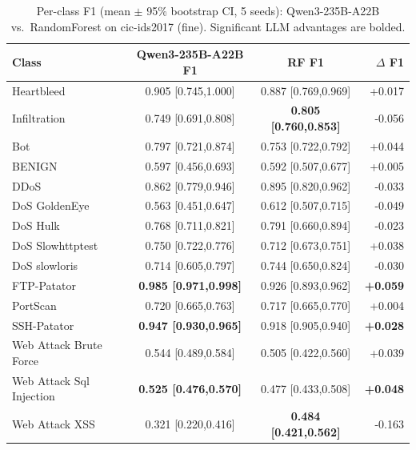 \begin{table}[t]
\caption{Per-class F1 (mean $\pm$ 95\% bootstrap CI, 5 seeds): Qwen3-235B-A22B vs.\ RandomForest on cic-ids2017 (fine). Significant LLM advantages are bolded.}
\label{t:r2_perclass}
\begin{tabular}{lccr}
\hline
Class & Qwen3-235B-A22B F1 & RF F1 & $\Delta$ F1 \\
\hline
Heartbleed & 0.905 [0.745,1.000] & 0.887 [0.769,0.969] & +0.017 \\
Infiltration & 0.749 [0.691,0.808] & \textbf{0.805 [0.760,0.853]} & -0.056 \\
Bot & 0.797 [0.721,0.874] & 0.753 [0.722,0.792] & +0.044 \\
BENIGN & 0.597 [0.456,0.693] & 0.592 [0.507,0.677] & +0.005 \\
DDoS & 0.862 [0.779,0.946] & 0.895 [0.820,0.962] & -0.033 \\
DoS GoldenEye & 0.563 [0.451,0.647] & 0.612 [0.507,0.715] & -0.049 \\
DoS Hulk & 0.768 [0.711,0.821] & 0.791 [0.660,0.894] & -0.023 \\
DoS Slowhttptest & 0.750 [0.722,0.776] & 0.712 [0.673,0.751] & +0.038 \\
DoS slowloris & 0.714 [0.605,0.797] & 0.744 [0.650,0.824] & -0.030 \\
FTP-Patator & \textbf{0.985 [0.971,0.998]} & 0.926 [0.893,0.962] & \textbf{+0.059} \\
PortScan & 0.720 [0.665,0.763] & 0.717 [0.665,0.770] & +0.004 \\
SSH-Patator & \textbf{0.947 [0.930,0.965]} & 0.918 [0.905,0.940] & \textbf{+0.028} \\
Web Attack  Brute Force & 0.544 [0.489,0.584] & 0.505 [0.422,0.560] & +0.039 \\
Web Attack  Sql Injection & \textbf{0.525 [0.476,0.570]} & 0.477 [0.433,0.508] & \textbf{+0.048} \\
Web Attack  XSS & 0.321 [0.220,0.416] & \textbf{0.484 [0.421,0.562]} & -0.163 \\
\hline
\end{tabular}
\end{table}